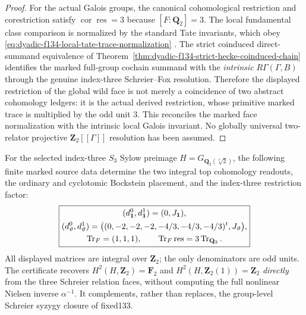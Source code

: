 \begin{proof}
For the actual
Galois groups,
the canonical
cohomological
restriction and
corestriction
satisfy
$\operatorname{cor}
\operatorname{res}=3$
because $[F:\mathbf Q_2]=3$.
The local
fundamental
class comparison
is normalized
by the standard
Tate invariants,
which obey
\eqref{eq:dyadic-f134-local-tate-trace-normalization}
\cite{NSW}.
The strict coinduced
direct-summand
equivalence of
Theorem~\ref{thm:dyadic-f134-strict-hecke-coinduced-chain}
identifies the
marked full-group
cochain summand
with the
\emph{intrinsic}
$R\Gamma(\Gamma,B)$
through the
genuine
index-three
Schreier--Fox
resolution.
Therefore the
displayed restriction
of the global
wild face is
not merely a
coincidence of
two abstract
cohomology ledgers:
it is the
actual derived
restriction,
whose primitive
marked trace
is multiplied
by the odd
unit $3$.
This reconciles
the marked face
normalization
with the
intrinsic local
Galois invariant.
No globally
universal
two-relator
projective
$\mathbf Z_2[[\Gamma]]$
resolution
has been assumed.
\end{proof}

\begin{corollary}
\label{cor:dyadic-f134-primitive-trace-certificate}
For the selected
index-three
$S_3$ Sylow
preimage
$H=G_{\mathbf Q_2(\sqrt[3]2)}$,
the following
finite marked
source data
determine the
two integral
top cohomology
readouts,
the ordinary
and cyclotomic
Bockstein
placement, and
the index-three
restriction
factor:
\begin{equation}\label{eq:dyadic-f134-final-trace-certificate}
\boxed{
\begin{gathered}
(d_{\bf1}^0,d_{\bf1}^1)
=(0,J_{\bf1}),\\
(d_{\vartheta}^0,d_{\vartheta}^1)
=\bigl(
(0,-2,-2,-2,-4/3,-4/3,-4/3)^t,
J_{\vartheta}\bigr),\\
\operatorname{Tr}_F=(1,1,1),
\qquad
\operatorname{Tr}_F\operatorname{res}
=3\operatorname{Tr}_{\mathbf Q_2}.
\end{gathered}}
\end{equation}
All displayed
matrices are
integral over
$\mathbf Z_2$;
the only
denominators are
odd units.
The certificate
recovers
$H^2(H,\mathbf Z_2)
=\mathbf F_2$
and
$H^2(H,\mathbf Z_2(1))
=\mathbf Z_2$
\emph{directly}
from the three
Schreier relation
faces, without
computing the
full nonlinear
Nielsen inverse
$\alpha^{-1}$.
It complements,
rather than
replaces, the
group-level
Schreier
syzygy closure
of fixed133.
\end{corollary}

